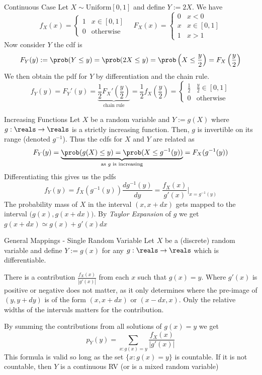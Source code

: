 \documentclass[11pt,a4paper]{article}
\begin{document}
\begin{example}{Continuous Case}
  Let $X\sim\text{Uniform}[0,1]$ and define $Y:=2X$. We have
  \[ f_X(x)=\begin{cases}1&x\in[0,1]\\0&\text{otherwise}\end{cases}\quad F_X(x)=\begin{cases}0&x<0\\x&x\in[0,1]\\1&x>1\end{cases} \]
  Now consider $Y$ the cdf is
  \[ F_Y(y):=\prob(Y\leq y)=\prob(2X\leq y)=\prob\left(X\leq\frac{y}2\right)=F_X\left(\frac{y}2\right) \]
  We then obtain the pdf for $Y$ by differentiation and the chain rule.
  \[f_Y(y)=F_Y'(y)=\underbrace{\frac12F_X'\left(\frac{y}2\right)}_\text{chain rule}=\frac12f_X\left(\frac{y}2\right)=\begin{cases}\frac12&\frac{y}2\in[0,1]\\0&\text{otherwise}\end{cases}  \]
\end{example}

\begin{proposition}{Increasing Functions}
  Let $X$ be a random variable and $Y:=g(X)$ where $g:\reals\to\reals$ is a strictly increasing function. Then, $g$ is invertible on its range (denoted $g^{-1}$). Thus the cdfs for $X$ and $Y$ are related as
  \[ F_Y(y)=\underbrace{\prob(g(X)\leq y)=\prob(X\leq g^{-1}(y))}_\text{as $g$ is increasing}=F_X(g^{-1}(y)) \]
  Differentiating this gives us the pdfs
  \[ f_Y(y)=f_X\left(g^{-1}(y)\right)\frac{dg^{-1}(y)}{dy}=\frac{f_X(x)}{g'(x)}\bigg|_{x=g^{-1}(y)} \]
  The probability mass of $X$ in the interval $(x,x+dx)$ gets mapped to the interval $\big(g(x),g(x+dx)\big)$. By \textit{Taylor Expansion} of $g$ we get $g(x+dx)\simeq g(x)+g'(x)dx$
\end{proposition}

\begin{proposition}{General Mappings - Single Random Variable}
  Let $X$ be a (discrete) random variable and define $Y:=g(x)$ for any $g:\reals\to\reals$ which is differentiable.
  \par There is a contribution $\frac{f_X(x)}{|g'(x)|}$ from each $x$ such that $g(x)=y$. Where $g'(x)$ is positive or negative does not matter, as it only determines where the pre-image of $(y,y+dy)$ is of the form $(x,x+dx)$ or $(x-dx,x)$. Only the relative widths of the intervals matters for the contribution.
  \par By summing the contributions from all solutions of $g(x)=y$ we get
  \[ p_Y(y)=\sum_{x:g(x)=y}\frac{f_X(x)}{|g'(x)|} \]
  This formula is valid so long as the set $\{x:g(x)=y\}$ is countable. If it is not countable, then $Y$ is a continuous RV (or is a mixed random variable)
\end{proposition}
\end{document}
